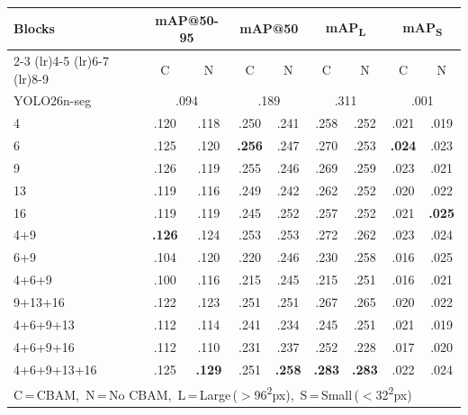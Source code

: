 \begin{table}[ht]
\begin{center}
\scriptsize
\setlength{\tabcolsep}{2pt}
\begin{tabular}{l cc cc cc cc}
\toprule
\multirow{2}{*}{\textbf{Blocks}}
  & \multicolumn{2}{c}{\textbf{mAP@50-95}}
  & \multicolumn{2}{c}{\textbf{mAP@50}}
  & \multicolumn{2}{c}{\textbf{mAP\textsubscript{L}}}
  & \multicolumn{2}{c}{\textbf{mAP\textsubscript{S}}} \\
\cmidrule(lr){2-3} \cmidrule(lr){4-5} \cmidrule(lr){6-7} \cmidrule(lr){8-9}
  & C & N & C & N & C & N & C & N \\
\midrule
YOLO26n-seg & \multicolumn{2}{c}{.094} & \multicolumn{2}{c}{.189} & \multicolumn{2}{c}{.311} & \multicolumn{2}{c}{.001} \\
\midrule
4                & .120 & .118 & .250 & .241 & .258 & .252 & .021 & .019 \\
6                & .125 & .120 & \textbf{.256} & .247 & .270 & .253 & \textbf{.024} & .023 \\
9                & .126 & .119 & .255 & .246 & .269 & .259 & .023 & .021 \\
\midrule
13               & .119 & .116 & .249 & .242 & .262 & .252 & .020 & .022 \\
16               & .119 & .119 & .245 & .252 & .257 & .252 & .021 & \textbf{.025} \\
4+9              & \textbf{.126} & .124 & .253 & .253 & .272 & .262 & .023 & .024 \\
6+9              & .104 & .120 & .220 & .246 & .230 & .258 & .016 & .025 \\
\midrule
4+6+9            & .100 & .116 & .215 & .245 & .215 & .251 & .016 & .021 \\
9+13+16          & .122 & .123 & .251 & .251 & .267 & .265 & .020 & .022 \\
4+6+9+13         & .112 & .114 & .241 & .234 & .245 & .251 & .021 & .019 \\
4+6+9+16         & .112 & .110 & .231 & .237 & .252 & .228 & .017 & .020 \\
\midrule
4+6+9+13+16      & .125 & \textbf{.129} & .251 & \textbf{.258} & \textbf{.283} & \textbf{.283} & .022 & .024 \\
\bottomrule
\multicolumn{9}{l}{\scriptsize C\,=\,CBAM,\ N\,=\,No CBAM,\ L\,=\,Large\,($>$96\textsuperscript{2}px),\ S\,=\,Small\,($<$32\textsuperscript{2}px)}
\end{tabular}
\end{center}
\end{table}
